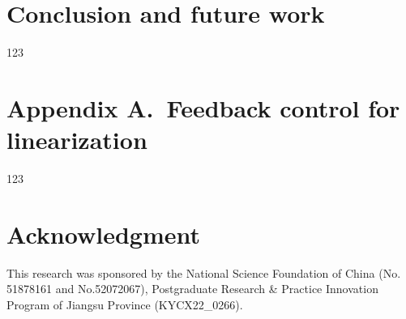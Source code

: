 \documentclass[a4paper]{cas-sc}
\begin{document}


\section{Conclusion and future work}
\label{Section 6}
123
\appendix


\section*{Appendix A.~Feedback control for linearization}
\label{AppendixA}
123

\printcredits

\section*{Acknowledgment}

This research was sponsored by the National Science Foundation of China (No. 51878161 and No.52072067), Postgraduate Research \& Practice Innovation Program of Jiangsu Province (KYCX22\_0266).

% 





\end{document}
